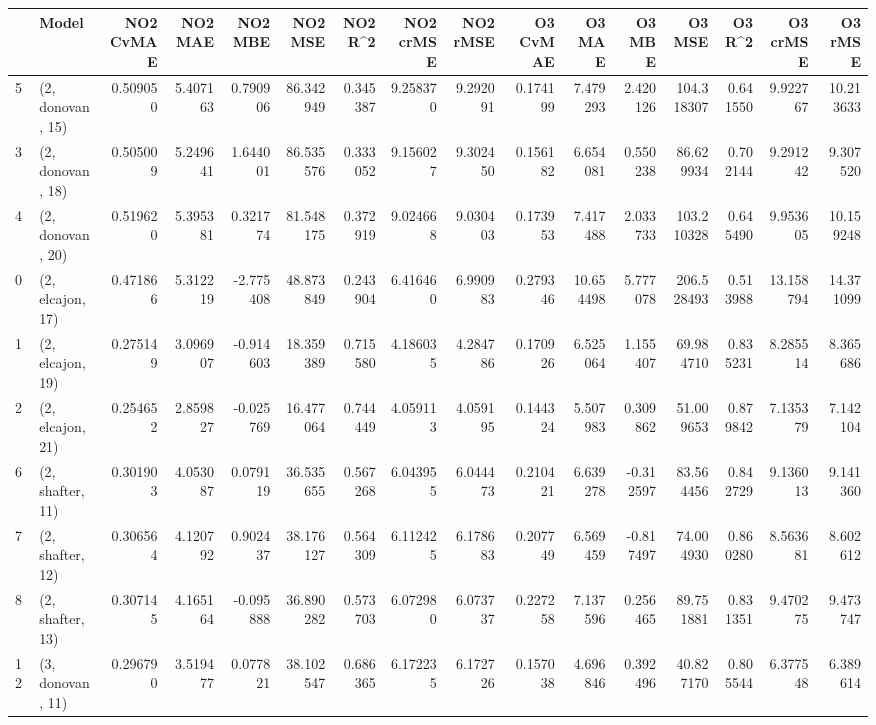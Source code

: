 \begin{tabular}{llrrrrrrrrrrrrrr}
\toprule
{} &             Model &  NO2 CvMAE &   NO2 MAE &   NO2 MBE &    NO2 MSE &   NO2 R\textasciicircum2 &  NO2 crMSE &  NO2 rMSE &  O3 CvMAE &     O3 MAE &    O3 MBE &      O3 MSE &    O3 R\textasciicircum2 &   O3 crMSE &    O3 rMSE \\
\midrule
5  &  (2, donovan, 15) &   0.509050 &  5.407163 &  0.790906 &  86.342949 &  0.345387 &   9.258370 &  9.292091 &  0.174199 &   7.479293 &  2.420126 &  104.318307 &  0.641550 &   9.922767 &  10.213633 \\
3  &  (2, donovan, 18) &   0.505009 &  5.249641 &  1.644001 &  86.535576 &  0.333052 &   9.156027 &  9.302450 &  0.156182 &   6.654081 &  0.550238 &   86.629934 &  0.702144 &   9.291242 &   9.307520 \\
4  &  (2, donovan, 20) &   0.519620 &  5.395381 &  0.321774 &  81.548175 &  0.372919 &   9.024668 &  9.030403 &  0.173953 &   7.417488 &  2.033733 &  103.210328 &  0.645490 &   9.953605 &  10.159248 \\
0  &  (2, elcajon, 17) &   0.471866 &  5.312219 & -2.775408 &  48.873849 &  0.243904 &   6.416460 &  6.990983 &  0.279346 &  10.654498 &  5.777078 &  206.528493 &  0.513988 &  13.158794 &  14.371099 \\
1  &  (2, elcajon, 19) &   0.275149 &  3.096907 & -0.914603 &  18.359389 &  0.715580 &   4.186035 &  4.284786 &  0.170926 &   6.525064 &  1.155407 &   69.984710 &  0.835231 &   8.285514 &   8.365686 \\
2  &  (2, elcajon, 21) &   0.254652 &  2.859827 & -0.025769 &  16.477064 &  0.744449 &   4.059113 &  4.059195 &  0.144324 &   5.507983 &  0.309862 &   51.009653 &  0.879842 &   7.135379 &   7.142104 \\
6  &  (2, shafter, 11) &   0.301903 &  4.053087 &  0.079119 &  36.535655 &  0.567268 &   6.043955 &  6.044473 &  0.210421 &   6.639278 & -0.312597 &   83.564456 &  0.842729 &   9.136013 &   9.141360 \\
7  &  (2, shafter, 12) &   0.306564 &  4.120792 &  0.902437 &  38.176127 &  0.564309 &   6.112425 &  6.178683 &  0.207749 &   6.569459 & -0.817497 &   74.004930 &  0.860280 &   8.563681 &   8.602612 \\
8  &  (2, shafter, 13) &   0.307145 &  4.165164 & -0.095888 &  36.890282 &  0.573703 &   6.072980 &  6.073737 &  0.227258 &   7.137596 &  0.256465 &   89.751881 &  0.831351 &   9.470275 &   9.473747 \\
12 &  (3, donovan, 11) &   0.296790 &  3.519477 &  0.077821 &  38.102547 &  0.686365 &   6.172235 &  6.172726 &  0.157038 &   4.696846 &  0.392496 &   40.827170 &  0.805544 &   6.377548 &   6.389614 \\

\end{tabular}
